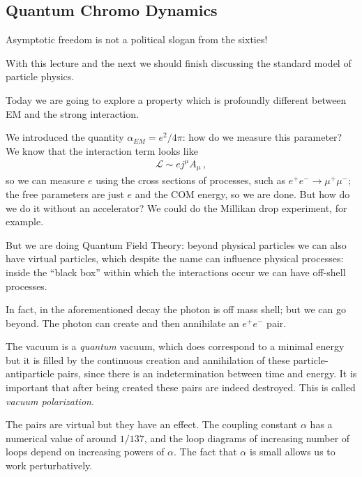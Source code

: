 \documentclass[main.tex]{subfiles}
\begin{document}
\subsection{Quantum Chromo Dynamics}


Asymptotic freedom is not a political slogan from the sixties!

With this lecture and the next we should finish discussing the standard model of particle physics. 

Today we are going to explore a property which is profoundly different between EM and the strong interaction. 

We introduced the quantity \(\alpha_{EM} = e^2 / 4 \pi \): how do we measure this parameter?
We know that the interaction term looks like 
%
\begin{align}
\mathscr{L} \sim e j^{\mu }A_{\mu }
\,,
\end{align}
%
so we can measure \(e\) using the cross sections of processes, such as \(e^{+} e^{-} \to \mu^{+} \mu^{-}\); the free parameters are just \(e\) and the COM energy, so we are done. 
But how do we do it without an accelerator? We could do the Millikan drop experiment, for example. 

But we are doing Quantum Field Theory: beyond physical particles we can also have virtual particles, which despite the name can influence physical processes: inside the ``black box'' within which the interactions occur we can have off-shell processes. 

In fact, in the aforementioned decay the photon is off mass shell; but we can go beyond. The photon can create and then annihilate an \(e^{+} e^{-}\) pair. 

The vacuum is a \emph{quantum} vacuum, which does correspond to a minimal energy but it is filled by the continuous creation and annihilation of these particle-antiparticle pairs, since there is an indetermination between time and energy. 
It is important that after being created these pairs are indeed destroyed.
This is called \emph{vacuum polarization}.

The pairs are virtual but they have an effect. The coupling constant \(\alpha \) has a numerical value of around \(1 / 137\), and the loop diagrams of increasing number of loops depend on increasing powers of \(\alpha \). 
The fact that \(\alpha \) is small allows us to work perturbatively. 
\end{document}
